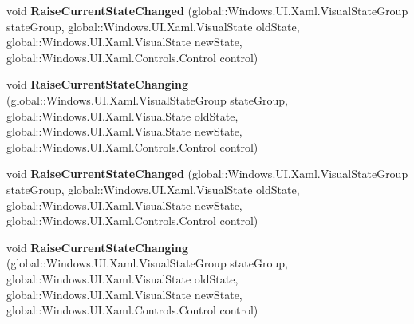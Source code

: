 \begin{DoxyCompactItemize}
\item 
\mbox{\label{interface_windows_1_1_u_i_1_1_xaml_1_1_i_visual_state_manager_protected_afa2eeeca38b915ac90433ee45157dd08}} 
void {\bfseries Raise\+Current\+State\+Changed} (global\+::\+Windows.\+U\+I.\+Xaml.\+Visual\+State\+Group state\+Group, global\+::\+Windows.\+U\+I.\+Xaml.\+Visual\+State old\+State, global\+::\+Windows.\+U\+I.\+Xaml.\+Visual\+State new\+State, global\+::\+Windows.\+U\+I.\+Xaml.\+Controls.\+Control control)
\item 
\mbox{\label{interface_windows_1_1_u_i_1_1_xaml_1_1_i_visual_state_manager_protected_ac1e3522381da08d1c931610141d5b03a}} 
void {\bfseries Raise\+Current\+State\+Changing} (global\+::\+Windows.\+U\+I.\+Xaml.\+Visual\+State\+Group state\+Group, global\+::\+Windows.\+U\+I.\+Xaml.\+Visual\+State old\+State, global\+::\+Windows.\+U\+I.\+Xaml.\+Visual\+State new\+State, global\+::\+Windows.\+U\+I.\+Xaml.\+Controls.\+Control control)
\item 
\mbox{\label{interface_windows_1_1_u_i_1_1_xaml_1_1_i_visual_state_manager_protected_afa2eeeca38b915ac90433ee45157dd08}} 
void {\bfseries Raise\+Current\+State\+Changed} (global\+::\+Windows.\+U\+I.\+Xaml.\+Visual\+State\+Group state\+Group, global\+::\+Windows.\+U\+I.\+Xaml.\+Visual\+State old\+State, global\+::\+Windows.\+U\+I.\+Xaml.\+Visual\+State new\+State, global\+::\+Windows.\+U\+I.\+Xaml.\+Controls.\+Control control)
\item 
\mbox{\label{interface_windows_1_1_u_i_1_1_xaml_1_1_i_visual_state_manager_protected_ac1e3522381da08d1c931610141d5b03a}} 
void {\bfseries Raise\+Current\+State\+Changing} (global\+::\+Windows.\+U\+I.\+Xaml.\+Visual\+State\+Group state\+Group, global\+::\+Windows.\+U\+I.\+Xaml.\+Visual\+State old\+State, global\+::\+Windows.\+U\+I.\+Xaml.\+Visual\+State new\+State, global\+::\+Windows.\+U\+I.\+Xaml.\+Controls.\+Control control)
\item 
\mbox{\label{interface_windows_1_1_u_i_1_1_xaml_1_1_i_visual_state_manager_protected_afa2eeeca38b915ac90433ee45157dd08}} 

\end{DoxyCompactItemize}
